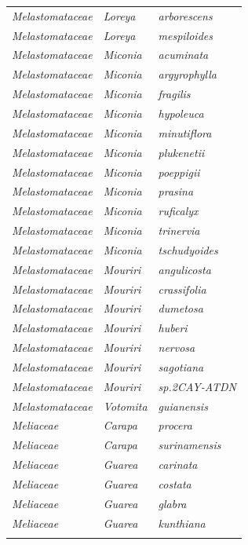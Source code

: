 \documentclass[fleqn,10pt]{ArtEcoFoG} %
\begin{document}
\begin{table}[t]
\begin{tabular}{lll}
\em{Melastomataceae} & \em{Loreya} & \em{arborescens}\\
\em{Melastomataceae} & \em{Loreya} & \em{mespiloides}\\
\addlinespace
\em{Melastomataceae} & \em{Miconia} & \em{acuminata}\\
\em{Melastomataceae} & \em{Miconia} & \em{argyrophylla}\\
\em{Melastomataceae} & \em{Miconia} & \em{fragilis}\\
\em{Melastomataceae} & \em{Miconia} & \em{hypoleuca}\\
\em{Melastomataceae} & \em{Miconia} & \em{minutiflora}\\
\addlinespace
\em{Melastomataceae} & \em{Miconia} & \em{plukenetii}\\
\em{Melastomataceae} & \em{Miconia} & \em{poeppigii}\\
\em{Melastomataceae} & \em{Miconia} & \em{prasina}\\
\em{Melastomataceae} & \em{Miconia} & \em{ruficalyx}\\
\em{Melastomataceae} & \em{Miconia} & \em{trinervia}\\
\addlinespace
\em{Melastomataceae} & \em{Miconia} & \em{tschudyoides}\\
\em{Melastomataceae} & \em{Mouriri} & \em{angulicosta}\\
\em{Melastomataceae} & \em{Mouriri} & \em{crassifolia}\\
\em{Melastomataceae} & \em{Mouriri} & \em{dumetosa}\\
\em{Melastomataceae} & \em{Mouriri} & \em{huberi}\\
\addlinespace
\em{Melastomataceae} & \em{Mouriri} & \em{nervosa}\\
\em{Melastomataceae} & \em{Mouriri} & \em{sagotiana}\\
\em{Melastomataceae} & \em{Mouriri} & \em{sp.2CAY-ATDN}\\
\em{Melastomataceae} & \em{Votomita} & \em{guianensis}\\
\em{Meliaceae} & \em{Carapa} & \em{procera}\\
\addlinespace
\em{Meliaceae} & \em{Carapa} & \em{surinamensis}\\
\em{Meliaceae} & \em{Guarea} & \em{carinata}\\
\em{Meliaceae} & \em{Guarea} & \em{costata}\\
\em{Meliaceae} & \em{Guarea} & \em{glabra}\\
\em{Meliaceae} & \em{Guarea} & \em{kunthiana}\\
\addlinespace

\end{tabular}
\end{table}
\end{document}
